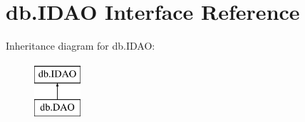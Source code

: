 \hypertarget{interfacedb_1_1_i_d_a_o}{}\section{db.\+I\+D\+AO Interface Reference}
\label{interfacedb_1_1_i_d_a_o}
Inheritance diagram for db.\+I\+D\+AO\+:\begin{figure}[H]
\begin{center}
\leavevmode
\includegraphics[height=2.000000cm]{interfacedb_1_1_i_d_a_o}
\end{center}
\end{figure}
